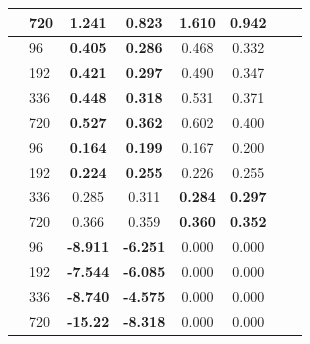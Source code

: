 \begin{table}[!ht]
\begin{center}
\begin{tabular}{ll | cccccc}
									& 720 & \textbf{1.241}  & \textbf{0.823}  & 1.610          & 0.942            \\ \midrule
\parbox[t]{1mm}{}
									& 96  & \textbf{0.405}  & \textbf{0.286}  & 0.468          & 0.332            \\
									& 192 & \textbf{0.421}  & \textbf{0.297}  & 0.490          & 0.347            \\
									& 336 & \textbf{0.448}  & \textbf{0.318}  & 0.531          & 0.371            \\
									& 720 & \textbf{0.527}  & \textbf{0.362}  & 0.602          & 0.400            \\ \midrule
\parbox[t]{1mm}{}
									& 96  & \textbf{0.164}  & \textbf{0.199}  & 0.167          & 0.200            \\
									& 192 & \textbf{0.224}  & \textbf{0.255}  & 0.226          & 0.255            \\
									& 336 & 0.285           & 0.311           & \textbf{0.284} & \textbf{0.297}   \\
									& 720 & 0.366           & 0.359           & \textbf{0.360} & \textbf{0.352}   \\ \midrule \midrule
\parbox[t]{1mm}{}
									& 96  & \textbf{-8.911} & \textbf{-6.251} & 0.000          & 0.000            \\
									& 192 & \textbf{-7.544} & \textbf{-6.085} & 0.000          & 0.000            \\
									& 336 & \textbf{-8.740} & \textbf{-4.575} & 0.000          & 0.000            \\
									& 720 & \textbf{-15.22} & \textbf{-8.318} & 0.000          & 0.000            \\ \bottomrule
	\end{tabular}
	\end{center}
\end{table}